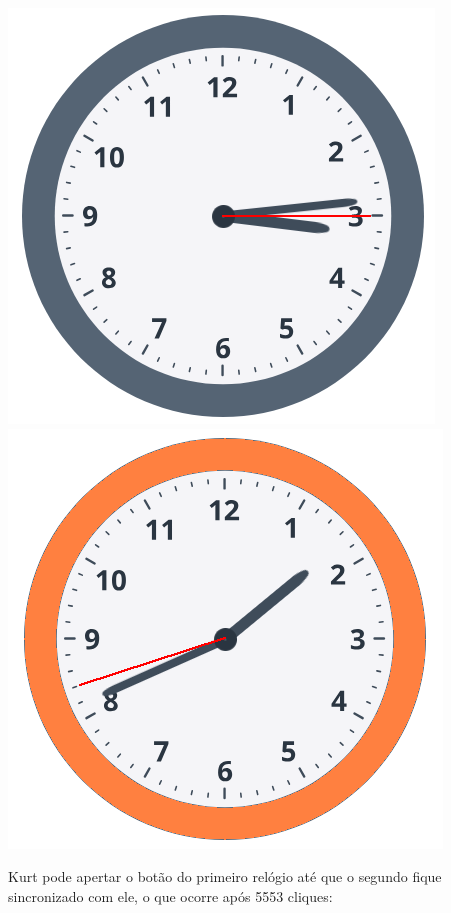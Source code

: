 \includegraphics[scale=0.5]{relogio1.png}
\includegraphics[scale=0.5]{relogio3.png}

Kurt pode apertar o botão do primeiro relógio até que o segundo fique sincronizado com ele, o que ocorre após 5553 cliques:

